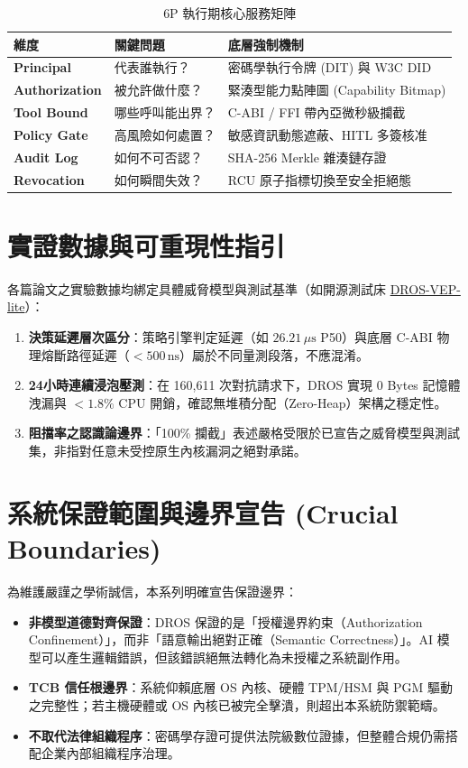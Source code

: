 \documentclass[conference]{IEEEtran}
\begin{document}
\begin{table}[h]
\caption{6P 執行期核心服務矩陣}
\label{tab:6p_matrix}
\centering
\footnotesize
\renewcommand{\arraystretch}{1.3}
\begin{tabularx}{\columnwidth}{l Y Y}
\toprule
\textbf{維度} & \textbf{關鍵問題} & \textbf{底層強制機制} \\
\midrule
\textbf{Principal} & 代表誰執行？ & 密碼學執行令牌 (DIT) 與 W3C DID \\
\textbf{Authorization} & 被允許做什麼？ & 緊湊型能力點陣圖 (Capability Bitmap) \\
\textbf{Tool Bound} & 哪些呼叫能出界？ & C-ABI / FFI 帶內亞微秒級攔截 \\
\textbf{Policy Gate} & 高風險如何處置？ & 敏感資訊動態遮蔽、HITL 多簽核准 \\
\textbf{Audit Log} & 如何不可否認？ & SHA-256 Merkle 雜湊鏈存證 \\
\textbf{Revocation} & 如何瞬間失效？ & RCU 原子指標切換至安全拒絕態 \\
\bottomrule
\end{tabularx}
\end{table}

\section{實證數據與可重現性指引}
各篇論文之實驗數據均綁定具體威脅模型與測試基準（如開源測試床 \href{https://github.com/Top-Celestial-Company-Ltd/DROS-VEP-lite}{DROS-VEP-lite}）：
\begin{enumerate}
    \item \textbf{決策延遲層次區分}：策略引擎判定延遲（如 $26.21\,\mu\mathrm{s}$ P50）與底層 C-ABI 物理熔斷路徑延遲（$<500\,\mathrm{ns}$）屬於不同量測段落，不應混淆。
    \item \textbf{24小時連續浸泡壓測}：在 160,611 次對抗請求下，DROS 實現 0 Bytes 記憶體洩漏與 $<1.8\%$ CPU 開銷，確認無堆積分配（Zero-Heap）架構之穩定性。
    \item \textbf{阻擋率之認識論邊界}：「100\% 攔截」表述嚴格受限於已宣告之威脅模型與測試集，非指對任意未受控原生內核漏洞之絕對承諾。
\end{enumerate}

\section{系統保證範圍與邊界宣告 (Crucial Boundaries)}
為維護嚴謹之學術誠信，本系列明確宣告保證邊界：
\begin{itemize}
    \item \textbf{非模型道德對齊保證}：DROS 保證的是「授權邊界約束（Authorization Confinement）」，而非「語意輸出絕對正確（Semantic Correctness）」。AI 模型可以產生邏輯錯誤，但該錯誤絕無法轉化為未授權之系統副作用。
    \item \textbf{TCB 信任根邊界}：系統仰賴底層 OS 內核、硬體 TPM/HSM 與 PGM 驅動之完整性；若主機硬體或 OS 內核已被完全擊潰，則超出本系統防禦範疇。
    \item \textbf{不取代法律組織程序}：密碼學存證可提供法院級數位證據，但整體合規仍需搭配企業內部組織程序治理。
\end{itemize}
\end{document}
